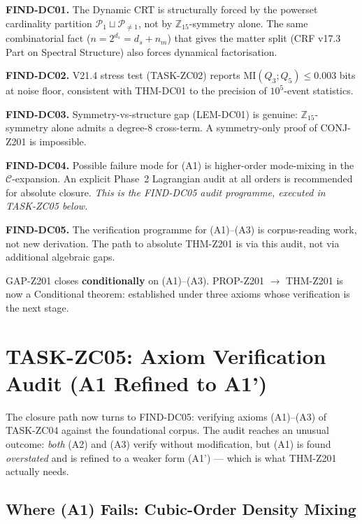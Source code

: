 \documentclass[12pt, a4paper]{article}
\begin{document}
\begin{formalbox}[title={Findings of TASK-ZC04 (FIND-DC01..05)}]
\textbf{FIND-DC01.} The Dynamic CRT is structurally forced by the
powerset cardinality partition $\mathcal{P}_1 \sqcup
\mathcal{P}_{\ne 1}$, not by $\mathbb{Z}_{15}$-symmetry alone.
The same combinatorial fact ($n = 2^{d_s} = d_s + n_m$) that gives
the matter split (CRF v17.3 Part on Spectral Structure) also forces
dynamical factorisation.

\textbf{FIND-DC02.} V21.4 stress test (TASK-ZC02) reports
$\mathrm{MI}(Q_3; Q_5) \le 0.003$ bits at noise floor, consistent
with THM-DC01 to the precision of $10^5$-event statistics.

\textbf{FIND-DC03.} Symmetry-vs-structure gap (LEM-DC01) is genuine:
$\mathbb{Z}_{15}$-symmetry alone admits a degree-8 cross-term. A
symmetry-only proof of CONJ-Z201 is impossible.

\textbf{FIND-DC04.} Possible failure mode for (A1) is higher-order
mode-mixing in the $\mathcal{C}$-expansion. An explicit Phase~2
Lagrangian audit at all orders is recommended for absolute closure.
\emph{This is the FIND-DC05 audit programme, executed in TASK-ZC05
below.}

\textbf{FIND-DC05.} The verification programme for (A1)--(A3) is
corpus-reading work, not new derivation. The path to absolute
THM-Z201 is via this audit, not via additional algebraic gaps.
\end{formalbox}

\begin{keybox}[title={Status After TASK-ZC04}]
GAP-Z201 closes \textbf{conditionally} on (A1)--(A3). PROP-Z201
$\to$ THM-Z201 is now a Conditional theorem: established under
three axioms whose verification is the next stage.
\end{keybox}



\section{TASK-ZC05: Axiom Verification Audit (A1 Refined to A1')}
\label{sec:Z2-zc05}

The closure path now turns to FIND-DC05: verifying axioms (A1)--(A3)
of TASK-ZC04 against the foundational corpus. The audit reaches an
unusual outcome: \emph{both} (A2) and (A3) verify without
modification, but (A1) is found \emph{overstated} and is refined to
a weaker form (A1') --- which is what THM-Z201 actually needs.

\subsection{Where (A1) Fails: Cubic-Order Density Mixing}
\end{document}
